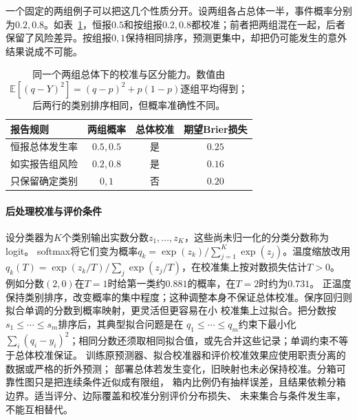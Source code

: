 一个固定的两组例子可以把这几个性质分开。设两组各占总体一半，事件概率分别为\(0.2,0.8\)。如表~\ref{tab:statistics-calibration-discrimination}，恒报\(0.5\)和按组报\(0.2,0.8\)都校准；前者把两组混在一起，后者保留了风险差异。按组报\(0,1\)保持相同排序，预测更集中，却把仍可能发生的意外结果说成不可能。
\begin{table}[htbp]
  \centering
  \small
  \begin{tabular}{lccc}
    \toprule
    报告规则 & 两组概率 & 总体校准 & 期望Brier损失 \\
    \midrule
    恒报总体发生率 & \(0.5,0.5\) & 是 & \(0.25\) \\
    如实报告组风险 & \(0.2,0.8\) & 是 & \(0.16\) \\
    只保留确定类别 & \(0,1\) & 否 & \(0.20\) \\
    \bottomrule
  \end{tabular}
  \caption{同一个两组总体下的校准与区分能力。数值由\(\mathbb E[(q-Y)^2]=(q-p)^2+p(1-p)\)逐组平均得到；后两行的类别排序相同，但概率准确性不同。}
  \label{tab:statistics-calibration-discrimination}
\end{table}

\paragraph{后处理校准与评价条件}
设分类器为\(K\)个类别输出实数分数\(z_1,\ldots,z_K\)，这些尚未归一化的分类分数称为logit。
softmax将它们变为概率\(q_k=\exp(z_k)/\sum_{j=1}^K\exp(z_j)\)。温度缩放改用
\(q_k(T)=\exp(z_k/T)/\sum_j\exp(z_j/T)\)，在校准集上按对数损失估计\(T>0\)。
例如分数\((2,0)\)在\(T=1\)时给第一类约\(0.881\)的概率，在\(T=2\)时约为\(0.731\)。
正温度保持类别排序，改变概率的集中程度；这种调整本身不保证总体校准。保序回归则拟合单调的分数到概率映射，更灵活但更容易在小
校准集上过拟合。把分数按\(s_1\leq\cdots\leq s_m\)排序后，其典型拟合问题是在
\(q_1\leq\cdots\leq q_m\)约束下最小化
\(\sum_i(q_i-y_i)^2\)；相同分数还须取相同拟合值，或先合并这些记录；单调约束不等于总体校准保证。
训练原预测器、拟合校准器和评价校准效果应使用职责分离的数据或严格的折外预测；
部署总体若发生变化，旧映射也未必保持校准。分箱可靠性图只是把连续条件近似成有限组，
箱内比例仍有抽样误差，且结果依赖分箱边界。适当评分、边际覆盖和校准分别评价分布损失、
未来集合与条件发生率，不能互相替代。

